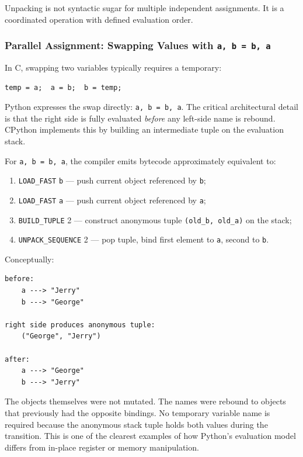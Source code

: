 \documentclass[a4paper,twoside]{report}
\begin{document}
Unpacking is not syntactic sugar for multiple independent assignments. It is a coordinated operation with defined evaluation order.

\subsubsection{Parallel Assignment: Swapping Values with \texttt{a, b = b, a}}

In C, swapping two variables typically requires a temporary:

\begin{verbatim}
temp = a;  a = b;  b = temp;
\end{verbatim}

Python expresses the swap directly: \texttt{a, b = b, a}. The critical architectural detail is that the right side is fully evaluated \emph{before} any left-side name is rebound. CPython implements this by building an intermediate tuple on the evaluation stack.

For \texttt{a, b = b, a}, the compiler emits bytecode approximately equivalent to:

\begin{enumerate}
    \item \texttt{LOAD\_FAST} \texttt{b} --- push current object referenced by \texttt{b};
    \item \texttt{LOAD\_FAST} \texttt{a} --- push current object referenced by \texttt{a};
    \item \texttt{BUILD\_TUPLE} 2 --- construct anonymous tuple \texttt{(old\_b, old\_a)} on the stack;
    \item \texttt{UNPACK\_SEQUENCE} 2 --- pop tuple, bind first element to \texttt{a}, second to \texttt{b}.
\end{enumerate}

Conceptually:

\begin{verbatim}
before:
    a ---> "Jerry"
    b ---> "George"

right side produces anonymous tuple:
    ("George", "Jerry")

after:
    a ---> "George"
    b ---> "Jerry"
\end{verbatim}

The objects themselves were not mutated. The names were rebound to objects that previously had the opposite bindings. No temporary variable name is required because the anonymous stack tuple holds both values during the transition. This is one of the clearest examples of how Python's evaluation model differs from in-place register or memory manipulation.
\end{document}
